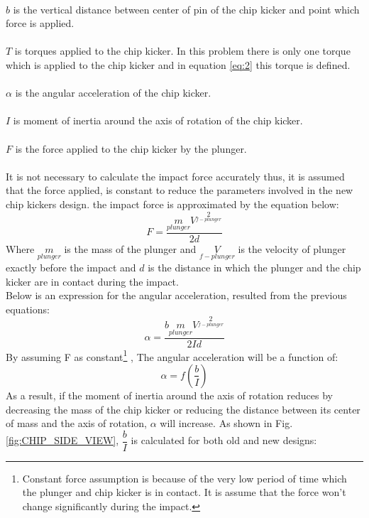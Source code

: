 \\
$b$ is the vertical distance between center of pin of the chip kicker and point which force is applied.\\
\\
$T$ is torques applied to the chip kicker. In this problem there is only one torque which is applied to the chip kicker and in equation \ref{eq:2} this torque is defined.\\
\\
$\alpha$ is the angular acceleration of the chip kicker.\\
\\
$I$ is moment of inertia around the axis of rotation of the chip kicker.\\
\\
$F$ is the force applied to the chip kicker by the plunger.\\
\\
It is not necessary to calculate the impact force accurately thus, it is assumed that the force applied, is constant to reduce the parameters involved in the new chip kickers design. the impact force is approximated by the equation below:
\begin{equation}
F=\dfrac{m\limits_{plunger} {V}^2\limits_{f-plunger}}{2d}
\end{equation}
Where $m\limits_{plunger}$ is the mass of the plunger and ${V}\limits_{f-plunger}$ is the velocity of plunger exactly before the impact and $d$ is the distance in which the plunger and the chip kicker are in contact during the impact.\\
\indent Below is an expression for the angular acceleration, resulted from the previous equations:
\begin{equation}
\alpha = \dfrac{b m\limits_{plunger} {V}^2\limits_{f-plunger}}{2Id}
\end{equation}
By assuming F as constant\footnote{Constant force assumption is because of the very low period of time which the plunger and chip kicker is in contact. It is assume that the force won’t change significantly during the impact.}
, The angular acceleration will be a function of:
\begin{equation}
\alpha=f(\dfrac{b}{I})
\end{equation}
As a result, if the moment of inertia around the axis of rotation reduces by decreasing the mass of the chip kicker or reducing the distance between its center of mass and the axis of rotation, $\alpha$ will increase.
As shown in Fig.\ref{fig:CHIP_SIDE_VIEW}, $\dfrac{b}{I}$ is calculated for both old and new designs:\\
